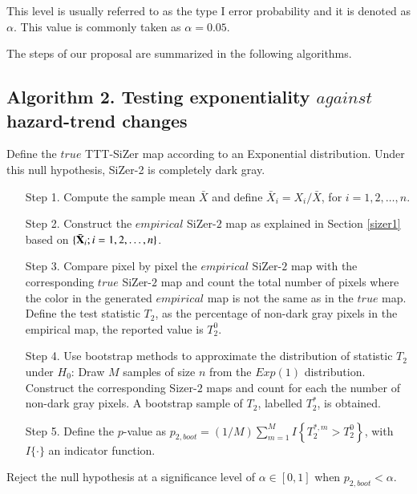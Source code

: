 \documentclass[preprint,12pt]{elsarticle}
\begin{document}
This level is usually referred to as the type I error probability and it is denoted as $\alpha$. This value is commonly taken as $\alpha=0.05$. 

The steps of our proposal are summarized in the following algorithms. 

\subsection*{Algorithm 2. Testing exponentiality $against$ hazard-trend changes} 
Define the $true$ TTT-SiZer map according to an Exponential distribution. Under this null hypothesis, SiZer-2 is completely dark gray. 
\begin{enumerate}
\item[Step 1.] Compute the sample mean $\bar{X}$ and define $\bar{X}_i=X_i/\bar{X}$, for $ i=1,2,\ldots,n$.

\item[Step 2.] Construct the $empirical$ SiZer-$2$ map as explained in Section \ref{sizer1} based on  $\{\bar{\bf X}_i; i=1, 2,\ldots, n \}$.
\item[Step 3.] Compare pixel by pixel the $empirical$ SiZer-$2$ map with the corresponding $true$ SiZer-$2$ map and count the total number of pixels where the color in the generated $empirical$ map is not the same as in the $true$ map. Define the test statistic $T_2$, as the percentage of non-dark gray pixels in the empirical map, the reported value is $T_2^0$.

\item[Step 4.] Use bootstrap methods to approximate the distribution of statistic $T_2$ under $H_0$: Draw $M$ samples of size $n$ from the $Exp(1)$ distribution. Construct the corresponding Sizer-$2$ maps and count for each the number of non-dark gray pixels. A bootstrap sample of $T_2$, labelled $T^{*}_2$, is obtained.

\item[Step 5.] Define the $p$-value as $p_{2,boot}=(1/M)\sum_{m=1}^M I\left\{T^{*,m}_2 > T_2^0\right\}$, with $I\{\cdot\}$ an indicator function.
\end{enumerate}
Reject the null hypothesis at a significance level of $\alpha \in [0,1]$ when $p_{2,boot} < \alpha$. 



\end{document}
